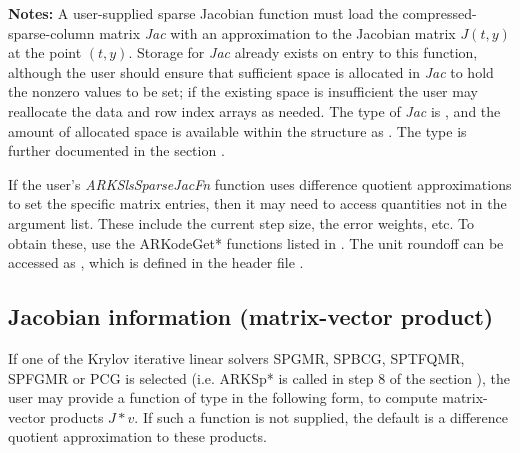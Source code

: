 \documentclass[letterpaper,10pt,english]{sphinxmanual}
\begin{document}
\begin{fulllineitems}
\textbf{Notes:} A user-supplied sparse Jacobian function must load the
compressed-sparse-column matrix \emph{Jac} with an approximation to the
Jacobian matrix \(J(t,y)\) at the point \((t,y)\).  Storage
for \emph{Jac} already exists on entry to this function, although the
user should ensure that sufficient space is allocated in \emph{Jac} to
hold the nonzero values to be set; if the existing space is
insufficient the user may reallocate the data and row index arrays
as needed.  The type of \emph{Jac} is , and the amount of
allocated space is available within the  structure as
. The  type is further documented in the section
{\hyperref[linear_solvers/index:linearsolvers]{\emph{}}}.

If the user's \emph{ARKSlsSparseJacFn} function uses difference quotient
approximations to set the specific matrix entries, then it may need
to access quantities not in the argument list.  These include the
current step size, the error weights, etc.  To obtain these, use
the ARKodeGet* functions listed in
{\hyperref[c_interface/User_callable:cinterface-optionaloutputs]{\emph{}}}. The unit roundoff can be
accessed as , which is defined in the header file
.

\end{fulllineitems}



\subsection{Jacobian information (matrix-vector product)}
\label{c_interface/User_supplied:cinterface-jtimesfn}\label{c_interface/User_supplied:jacobian-information-matrix-vector-product}
If one of the Krylov iterative linear solvers SPGMR, SPBCG, SPTFQMR,
SPFGMR or PCG is selected (i.e. ARKSp* is called in step 8 of the
section {\hyperref[c_interface/Skeleton:cinterface-skeleton]{\emph{}}}), the user may provide a function
of type {\hyperref[c_interface/User_supplied:c.ARKSpilsJacTimesVecFn]{\emph{}}} in the following form, to
compute matrix-vector products \(J*v\). If such a function is not
supplied, the default is a difference quotient approximation to these
products.
\end{document}
